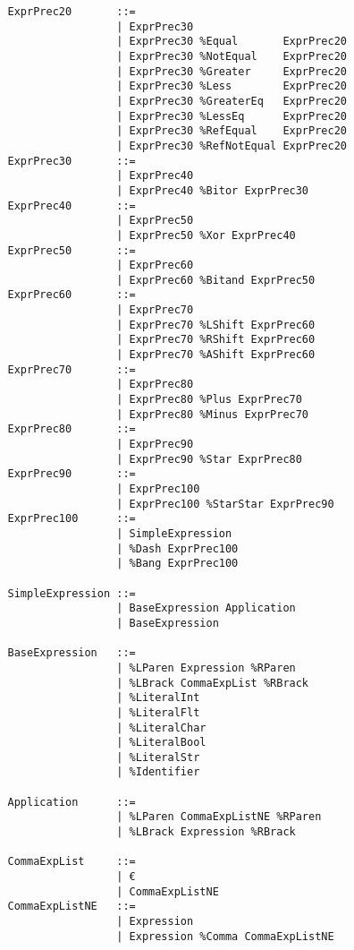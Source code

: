 \documentclass{article}
\begin{document}
\begin{verbatim}
				ExprPrec20       ::= 
				                 | ExprPrec30
				                 | ExprPrec30 %Equal       ExprPrec20
				                 | ExprPrec30 %NotEqual    ExprPrec20
				                 | ExprPrec30 %Greater     ExprPrec20
				                 | ExprPrec30 %Less        ExprPrec20
				                 | ExprPrec30 %GreaterEq   ExprPrec20
				                 | ExprPrec30 %LessEq      ExprPrec20
				                 | ExprPrec30 %RefEqual    ExprPrec20
				                 | ExprPrec30 %RefNotEqual ExprPrec20
				ExprPrec30       ::=
				                 | ExprPrec40
				                 | ExprPrec40 %Bitor ExprPrec30
				ExprPrec40       ::=
				                 | ExprPrec50
				                 | ExprPrec50 %Xor ExprPrec40
				ExprPrec50       ::=
				                 | ExprPrec60
				                 | ExprPrec60 %Bitand ExprPrec50
				ExprPrec60       ::=
				                 | ExprPrec70
				                 | ExprPrec70 %LShift ExprPrec60
				                 | ExprPrec70 %RShift ExprPrec60
				                 | ExprPrec70 %AShift ExprPrec60
				ExprPrec70       ::=
				                 | ExprPrec80
				                 | ExprPrec80 %Plus ExprPrec70
				                 | ExprPrec80 %Minus ExprPrec70
				ExprPrec80       ::=
				                 | ExprPrec90
				                 | ExprPrec90 %Star ExprPrec80
				ExprPrec90       ::=
				                 | ExprPrec100
				                 | ExprPrec100 %StarStar ExprPrec90
				ExprPrec100      ::=
				                 | SimpleExpression
				                 | %Dash ExprPrec100
				                 | %Bang ExprPrec100
				                 
				SimpleExpression ::=
				                 | BaseExpression Application
				                 | BaseExpression
				
				BaseExpression   ::=
				                 | %LParen Expression %RParen
				                 | %LBrack CommaExpList %RBrack
				                 | %LiteralInt
				                 | %LiteralFlt
				                 | %LiteralChar
				                 | %LiteralBool
				                 | %LiteralStr
				                 | %Identifier
				                 
				Application      ::=
				                 | %LParen CommaExpListNE %RParen
				                 | %LBrack Expression %RBrack
				
				CommaExpList     ::=
				                 | €
				                 | CommaExpListNE
				CommaExpListNE   ::=
				                 | Expression
				                 | Expression %Comma CommaExpListNE
			\end{verbatim}
	
\end{document}
